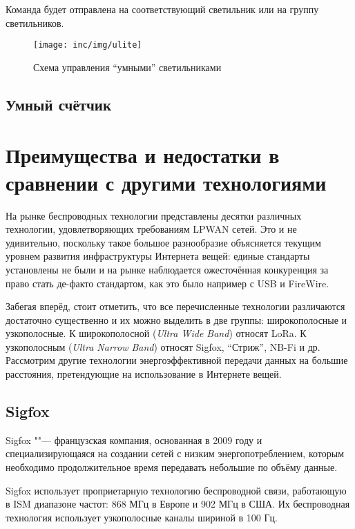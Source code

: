 Команда будет отправлена на соответствующий светильник или на группу светильников.

\begin{figure}[!h]
  \centering
  \texttt{[image: inc/img/ulite]}
  \caption{Схема управления ``умными'' светильниками \cite{isbergsite}}
  \label{fig:ulite}
\end{figure}

\subsection{Умный счётчик}


\section{Преимущества и недостатки в сравнении с другими технологиями}

На рынке беспроводных технологии представлены десятки различных технологии, удовлетворяющих требованиям LPWAN сетей.
Это и не удивительно, поскольку такое большое разнообразие объясняется текущим 
уровнем развития инфраструктуры Интернета вещей: единые стандарты установлены не 
были и на рынке наблюдается ожесточённая конкуренция за право стать де-факто 
стандартом, как это было например с USB и FireWire.

Забегая вперёд, стоит отметить, что все перечисленные технологии различаются 
достаточно существенно и их можно выделить в две группы: широкополосные и 
узкополосные.
К широкополосной (\textit{Ultra Wide Band}) относят LoRa.
К узкополосным (\textit{Ultra Narrow Band}) относят Sigfox, ``Стриж'', NB-Fi и 
др.
Рассмотрим другие технологии энергоэффективной передачи данных на большие 
расстояния, претендующие на использование в Интернете вещей.

\subsection{Sigfox}

Sigfox ""--- французская компания, основанная в 2009 году и специализирующаяся 
на создании сетей с низким энергопотреблением, которым необходимо 
продолжительное время передавать небольшие по объёму данные.

Sigfox использует проприетарную технологию беспроводной связи, работающую в ISM 
диапазоне частот: 868 МГц в Европе и 902 МГц в США. 
Их беспроводная технология использует узкополосные каналы шириной в 100 Гц.

